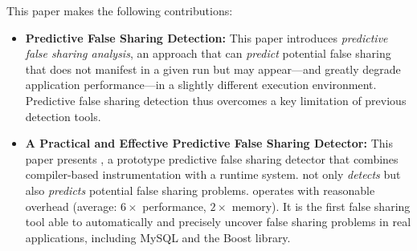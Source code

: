 This paper makes the following contributions:

\begin{itemize}


\item
\textbf{Predictive False Sharing Detection:} This paper introduces \emph{predictive false sharing analysis}, an approach that can \emph{predict} potential false sharing that does not manifest in a given run but may appear---and greatly degrade application performance---in a slightly different execution environment. 
Predictive false sharing detection thus overcomes a key limitation of previous detection tools.


\item
\textbf{A Practical and Effective Predictive False Sharing Detector:} 
This paper presents \Predator{}, a prototype predictive false sharing detector that combines compiler-based instrumentation with a runtime system. \Predator{} not only \emph{detects} but also \emph{predicts} potential false sharing problems.
\Predator{} operates with reasonable overhead (average: $6\times$ performance, $2\times$ memory). It is the first false sharing tool able to automatically and precisely uncover
false sharing problems in real applications, including 
MySQL and the Boost library.

\end{itemize}

